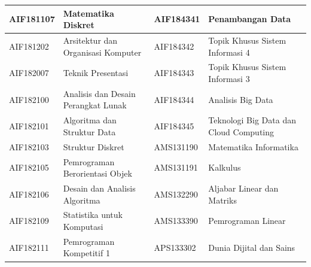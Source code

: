 \begin{enumerate}
\begin{table}[H]
\begin{tabular}{|p{3.25cm}|p{4.25cm}|p{3.25cm}|p{4.25cm}|}
AIF181107 & Matematika Diskret & AIF184341 & Penambangan Data \\ \hline
AIF181202 & Arsitektur dan Organisasi Komputer & AIF184342 & Topik Khusus Sistem Informasi 4 \\ \hline
AIF182007 & Teknik Presentasi & AIF184343 & Topik Khusus Sistem Informasi 3 \\ \hline
AIF182100 & Analisis dan Desain Perangkat Lunak & AIF184344 & Analisis Big Data \\ \hline
AIF182101 & Algoritma dan Struktur Data & AIF184345 & Teknologi Big Data dan Cloud Computing \\ \hline
AIF182103 & Struktur Diskret & AMS131190 & Matematika Informatika \\ \hline
AIF182105 & Pemrograman Berorientasi Objek & AMS131191 & Kalkulus \\ \hline
AIF182106 & Desain dan Analisis Algoritma & AMS132290 & Aljabar Linear dan Matriks \\ \hline
AIF182109 & Statistika untuk Komputasi & AMS133390 & Pemrograman Linear \\ \hline
AIF182111 & Pemrograman Kompetitif 1 & APS133302 & Dunia Dijital dan Sains \\ \hline
\end{tabular}
\end{table}


\end{enumerate}
